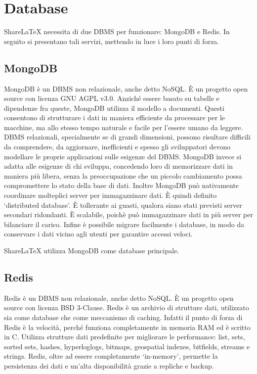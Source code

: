 \section{Database}
ShareLaTeX necessita di due DBMS per funzionare: MongoDB e Redis. In seguito si presentano tali servizi, mettendo in luce i loro punti di forza.

\subsection{MongoDB}
MongoDB \cite{mongodb} è un DBMS non relazionale, anche detto NoSQL. È un progetto open source con licenza GNU AGPL v3.0. Anziché essere basato su tabelle e dipendenze fra queste, MongoDB utilizza il modello a documenti. Questi consentono di strutturare i dati in maniera efficiente da processare per le macchine, ma allo stesso tempo naturale e facile per l'essere umano da leggere. DBMS relazionali, specialmente se di grandi dimensioni, possono risultare difficili da comprendere, da aggiornare, inefficienti e spesso gli sviluppatori devono modellare le proprie applicazioni sulle esigenze del DBMS. MongoDB invece si adatta alle esigenze di chi sviluppa, concedendo loro di memorizzare dati in maniera più libera, senza la preoccupazione che un piccolo cambiamento possa compromettere lo stato della base di dati. Inoltre MongoDB può nativamente coordinare molteplici server per immagazzinare dati. È quindi definito \enquote*{distributed database}. È tollerante ai guasti, qualora siano stati previsti server secondari ridondanti. È scalabile, poichè può immagazzinare dati in più server per bilanciare il carico. Infine è possibile migrare facilmente i database, in modo da conservare i dati vicino agli utenti per garantire accessi veloci.

ShareLaTeX utilizza MongoDB come database principale.

\subsection{Redis}
Redis \cite{redis} è un DBMS non relazionale, anche detto NoSQL. È un progetto open source con licenza BSD 3-Clause. Redis è un archivio di strutture dati, utilizzato sia come database che come meccanismo di caching. Infatti il punto di forza di Redis è la velocità, perché funziona completamente in memoria RAM ed è scritto in C. Utilizza strutture dati predefinite per migliorare le performance: list, sets, sorted sets, hashes, hyperloglogs, bitmaps, geospatial indexes, bitfields, streams e strings. Redis, oltre ad essere completamente \enquote*{in-memory}, permette la persistenza dei dati e un'alta disponibilità grazie a repliche e backup.

